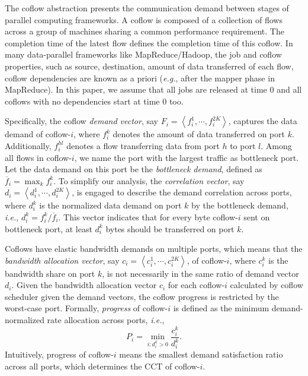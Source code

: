 \documentclass[10pt, conference, letterpaper]{IEEEtran}
\begin{document}
The coflow abstraction presents the communication demand between stages of parallel computing frameworks. A coflow is composed of a collection of flows across a group of machines sharing a common performance requirement. The completion time of the latest flow defines the completion time of this coflow. In many data-parallel frameworks like MapReduce/Hadoop, the job and coflow properties, such as source, destination, amount of data transferred of each flow, coflow dependencies are known as a priori (\emph{e.g.}, after the mapper phase in MapReduce)\cite{varys, aalo, bingchuan}. In this paper, we assume that all jobs are released at time 0 and all coflows with no dependencies start at time 0 too.

Specifically, the coflow \emph{demand vector}, say $F_i = \left\langle f_i^1,\cdots,f_i^{2K}\right\rangle$, captures the data demand of coflow-$i$, where $f_i^k$ denotes the amount of data transferred on port $k$. Additionally, $f_i^{hl}$ denotes a flow transferring data from port $h$ to port $l$. Among all flows in coflow-$i$, we name the port with the largest traffic as bottleneck port. Let the data demand on this port be the \emph{bottleneck demand}, defined as $\overline{f}_i=\max_{k} f_i^k$. To simplify our analysis, the \emph{correlation vector}, say $d_i = \left\langle d_i^1,\cdots,d_i^{2K}\right\rangle$, is engaged to describe the demand correlation across ports, where $d_i^k$ is the normalized data demand on port $k$ by the bottleneck demand, \emph{i.e.}, $d_i^k = f_i^k/\overline{f}_i$. This vector indicates that for every byte coflow-$i$ sent on bottleneck port, at least $d_i^k$ bytes should be transferred on port $k$.

Coflows have elastic bandwidth demands on multiple ports, which means that the \emph{bandwidth allocation vector}, say $c_i=\left\langle c_i^1,\cdots,c_i^{2K}\right\rangle$, of coflow-$i$, where $c_i^k$ is the bandwidth share on port $k$, is not necessarily in the same ratio of demand vector $d_i$. Given the bandwidth allocation vector $c_i$ for each coflow-$i$ calculated by coflow scheduler given the demand vectors, the coflow progress is restricted by the worst-case port. Formally, \emph{progress} of coflow-$i$ is defined as the minimum demand-normalized rate allocation across ports, \emph{i.e.},
 \begin{equation}
 	P_i = \min\limits_{i:d_i^k>0}\frac{c_i^k}{d_i^k}.
 \end{equation}
 Intuitively, progress of coflow-$i$ means the smallest demand satisfaction ratio across all ports, which determines the CCT of coflow-$i$.
\end{document}
